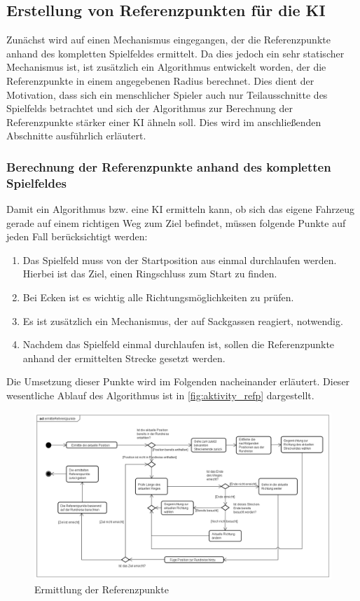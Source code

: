 \subsection{Erstellung von Referenzpunkten für die KI}
Zunächst wird auf einen Mechanismus eingegangen, der die Referenzpunkte anhand des kompletten Spielfeldes ermittelt. Da dies jedoch ein sehr statischer Mechanismus ist, ist zusätzlich ein Algorithmus entwickelt worden, der die Referenzpunkte in einem angegebenen Radius berechnet. Dies dient der Motivation, dass sich ein menschlicher Spieler auch nur Teilausschnitte des Spielfelds betrachtet und sich der Algorithmus zur Berechnung der Referenzpunkte stärker einer KI ähneln soll. Dies wird im anschließenden Abschnitte ausführlich erläutert.\\
\subsubsection{Berechnung der Referenzpunkte anhand des kompletten Spielfeldes}
Damit ein Algorithmus bzw. eine KI ermitteln kann, ob sich das eigene Fahrzeug gerade auf einem richtigen Weg zum Ziel befindet, müssen folgende Punkte auf jeden Fall berücksichtigt werden:
\begin{enumerate}
\item \label{en-pkt1} Das Spielfeld muss von der Startposition aus einmal durchlaufen werden. Hierbei ist das Ziel, einen Ringschluss zum Start zu finden.
\item \label{en-pkt2} Bei Ecken ist es wichtig alle Richtungsmöglichkeiten zu prüfen.
\item \label{en-pkt3} Es ist zusätzlich ein Mechanismus, der auf Sackgassen reagiert, notwendig.
\item \label{en-pkt4} Nachdem das Spielfeld einmal durchlaufen ist, sollen die Referenzpunkte anhand der ermittelten Strecke gesetzt werden.
\end{enumerate}
Die Umsetzung dieser Punkte wird im Folgenden nacheinander erläutert. Dieser wesentliche Ablauf des Algorithmus ist in \autoref{fig:aktivity_refp} dargestellt.

\begin{figure}[h]
\centering
\includegraphics[scale=0.4]{pics/ermittleReferenzpunkte.png}
\caption{Ermittlung der Referenzpunkte}
\label{fig:aktivity_refp}
\end{figure}

